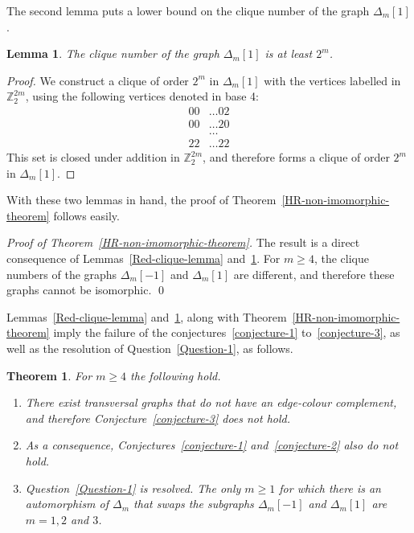 \documentclass[12pt,a4paper]{article}
\newcommand{\mb}[1]{\mathbb{#1}}
\newcommand{\Z}{\mb{Z}}
\newtheorem{Lemma}{Lemma}
\newtheorem{Theorem}{Theorem}
\newenvironment{proofof}[1]{\noindent\emph{Proof of #1.}}{\qed}
\begin{document}
The second lemma puts a lower bound on the clique number of the graph $\varDelta_m[1]$.
\begin{Lemma}
\label{Blue-clique-lemma}
The clique number of the graph $\varDelta_m[1]$ is at least $2^m$.
\end{Lemma}
\begin{proof}
We construct a clique of order $2^m$ in $\varDelta_m[1]$ with the vertices labelled in $\Z_2^{2m}$, 
using the following vertices denoted in base 4:
\begin{align*}
00 &\ldots 02
\\
00 &\ldots 20
\\
&\ldots
\\
22 &\ldots 22
\end{align*}
This set is closed under addition in $\Z_2^{2 m}$,
and therefore forms a clique of order $2^m$ in $\varDelta_m[1]$.
\end{proof}

With these two lemmas in hand, the proof of Theorem~\ref{HR-non-imomorphic-theorem} follows easily.

\begin{proofof}{Theorem~\ref{HR-non-imomorphic-theorem}}
The result is a direct consequence of Lemmas~\ref{Red-clique-lemma} and~\ref{Blue-clique-lemma}.
For $m \geqslant 4$, the clique numbers of the graphs $\varDelta_m[-1]$ and $\varDelta_m[1]$ are different,
and therefore these graphs cannot be isomorphic.
\end{proofof}

Lemmas~\ref{Red-clique-lemma} and~\ref{Blue-clique-lemma}, along with Theorem~\ref{HR-non-imomorphic-theorem}
imply the failure of the conjectures~\ref{conjecture-1} to~\ref{conjecture-3}, as well as the resolution of Question~\ref{Question-1}, as follows.
\begin{Theorem}
\label{Conjectures-are-false-theorem}
For $m \geqslant 4$ the following hold.
\begin{enumerate}
 \item 
There exist transversal graphs that do not have an edge-colour complement, and
therefore Conjecture~\ref{conjecture-3} does not hold.
\item
As a consequence, Conjectures~\ref{conjecture-1} and~\ref{conjecture-2} also do not hold.
\item
Question~\ref{Question-1} is resolved.
The only $m \geqslant 1$ for which there is an automorphism of $\varDelta_m$ 
that swaps the subgraphs $\varDelta_m[-1]$ and $\varDelta_m[1]$
are $m=1,2$ and $3$.
\end{enumerate}

\end{Theorem}
\end{document}
